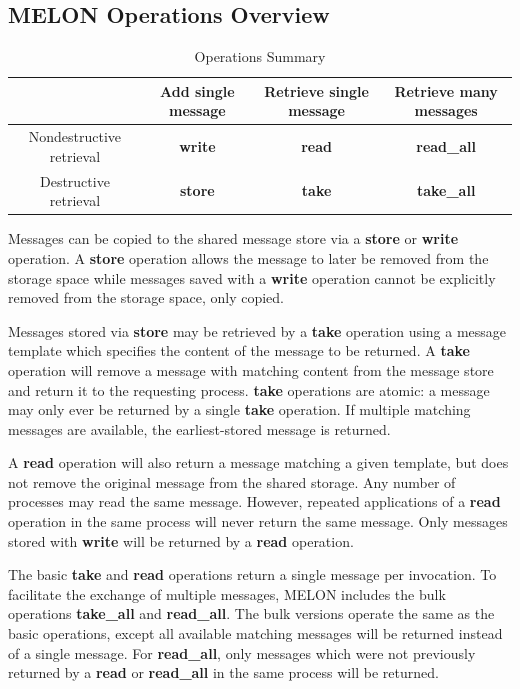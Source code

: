 \documentclass[lnicst]{svmultln}
\begin{document}
\subsection{MELON Operations Overview}

\begin{table}
\centering
\caption{Operations Summary}
\begin{tabular}{|c|c|c|c|} \hline
& Add single message & Retrieve single message & Retrieve many messages \\ \hline
Nondestructive retrieval & \textbf{write} & \textbf{read} & \textbf{read\_all} \\ \hline
Destructive retrieval & \textbf{store} & \textbf{take} & \textbf{take\_all} \\ \hline
\end{tabular}
\label{table:opsummary}
\end{table}

Messages can be copied to the shared message store via a \textbf{store} or \textbf{write} operation. A \textbf{store} operation allows the message to later be removed from the storage space while messages saved with a \textbf{write} operation cannot be explicitly removed from the storage space, only copied.

Messages stored via \textbf{store} may be retrieved by a \textbf{take} operation using a message template which specifies the content of the message to be returned. A \textbf{take} operation will remove a message with matching content from the message store and return it to the requesting process. \textbf{take} operations are atomic: a message may only ever be returned by a single \textbf{take} operation. If multiple matching messages are available, the earliest-stored message is returned.

A \textbf{read} operation will also return a message matching a given template, but does not remove the original message from the shared storage. Any number of processes may read the same message. However, repeated applications of a \textbf{read} operation in the same process will never return the same message. Only messages stored with \textbf{write} will be returned by a \textbf{read} operation.

The basic \textbf{take} and \textbf{read} operations return a single message per invocation. To facilitate the exchange of multiple messages, MELON includes the bulk operations \textbf{take\_all} and \textbf{read\_all}. The bulk versions operate the same as the basic operations, except all available matching messages will be returned instead of a single message. For \textbf{read\_all}, only messages which were not previously returned by a \textbf{read} or \textbf{read\_all} in the same process will be returned.
\end{document}
